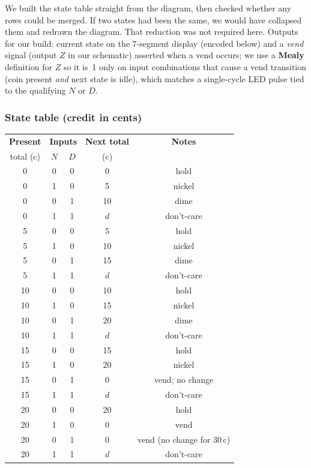 \documentclass[12pt, letterpaper]{article}
\begin{document}
We built the state table straight from the diagram, then checked whether any rows could be
merged.  If two states had been the same, we would have collapsed them and redrawn the diagram.
That reduction was not required here.
Outputs for our build: current state on the 7-segment display (encoded below)
and a \textit{vend} signal (output $Z$ in our schematic) asserted when a vend occurs; we use a
\textbf{Mealy} definition for $Z$ so it is~1 only on input combinations that cause a vend
transition (coin present \emph{and} next state is idle), which matches a single-cycle LED
pulse tied to the qualifying $N$ or $D$.

\subsubsection*{State table (credit in cents)}

\begin{center}
\small
\begin{tabular}{|c|cc|c|c|}
  \hline
  \textbf{Present} & \multicolumn{2}{c|}{\textbf{Inputs}} &
  \textbf{Next total} & \textbf{Notes} \\
  total (c) & $N$ & $D$ & (c) & \\
  \hline
  0 & 0 & 0 & 0 & hold \\
  0 & 1 & 0 & 5 & nickel \\
  0 & 0 & 1 & 10 & dime \\
  0 & 1 & 1 & $d$ & don't-care \\
  \hline
  5 & 0 & 0 & 5 & hold \\
  5 & 1 & 0 & 10 & nickel \\
  5 & 0 & 1 & 15 & dime \\
  5 & 1 & 1 & $d$ & don't-care \\
  \hline
  10 & 0 & 0 & 10 & hold \\
  10 & 1 & 0 & 15 & nickel \\
  10 & 0 & 1 & 20 & dime \\
  10 & 1 & 1 & $d$ & don't-care \\
  \hline
  15 & 0 & 0 & 15 & hold \\
  15 & 1 & 0 & 20 & nickel \\
  15 & 0 & 1 & 0 & vend; no change \\
  15 & 1 & 1 & $d$ & don't-care \\
  \hline
  20 & 0 & 0 & 20 & hold \\
  20 & 1 & 0 & 0 & vend \\
  20 & 0 & 1 & 0 & vend (no change for 30\,c) \\
  20 & 1 & 1 & $d$ & don't-care \\
  \hline
\end{tabular}
\end{center}
\end{document}
